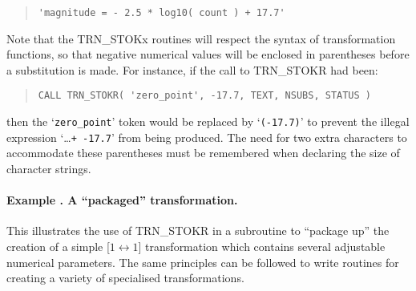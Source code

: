 \documentclass[twoside,11pt]{article}
\newcommand{\name}[1]{\mbox{\small{#1}}}
\newcounter{examplecounter}
\newcommand{\example}[1]{\addtocounter{examplecounter}{1}
                         \paragraph{\textbf{Example \theexamplecounter. #1}}}
\begin{document}
\begin{quote}
\begin{verbatim}
'magnitude = - 2.5 * log10( count ) + 17.7'
\end{verbatim}
\end{quote}

Note that the \name{TRN\_STOKx} routines will respect the syntax of
transformation functions, so that negative numerical values will be enclosed
in parentheses before a substitution is made. 
For instance, if the call to \name{TRN\_STOKR} had been:

\begin{quote}
\begin{verbatim}
CALL TRN_STOKR( 'zero_point', -17.7, TEXT, NSUBS, STATUS )
\end{verbatim}
\end{quote}

then the `\verb#zero_point#' token would be replaced by `\verb#(-17.7)#' to
prevent the illegal expression \mbox{`\ldots \texttt{+ -17.7}'} from being
produced. 
The need for two extra characters to accommodate these parentheses must be
remembered when declaring the size of character strings. 

\example{A ``packaged'' transformation.}
This illustrates the use of \name{TRN\_STOKR} in a subroutine to
``package up'' the creation of a simple \mbox{[$1 \leftrightarrow 1$]}
transformation which contains several adjustable numerical parameters.
The same principles can be followed to write routines for creating a variety
of specialised transformations. 
\end{document}
